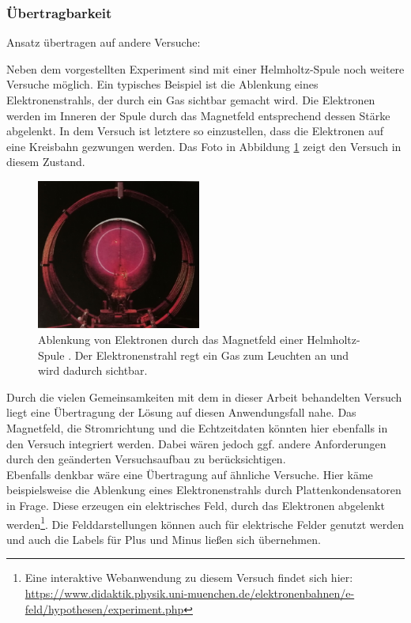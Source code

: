 \subsubsection{Übertragbarkeit}
Ansatz übertragen auf andere Versuche:

Neben dem vorgestellten Experiment sind mit einer Helmholtz-Spule noch weitere Versuche möglich. Ein typisches Beispiel ist die Ablenkung eines Elektronenstrahls, der durch ein Gas sichtbar gemacht wird. Die Elektronen werden im Inneren der Spule durch das Magnetfeld entsprechend dessen Stärke abgelenkt. In dem Versuch ist letztere so einzustellen, dass die Elektronen auf eine Kreisbahn gezwungen werden. Das Foto in Abbildung \ref{img:beam} zeigt den Versuch in diesem Zustand.\\

\begin{figure}
	\centering
	\includegraphics[width=0.48\textwidth]{images/papers/beam.jpg}
	\caption{Ablenkung von Elektronen durch das Magnetfeld einer Helmholtz-Spule \cite{Bader15}. Der Elektronenstrahl regt ein Gas zum Leuchten an und wird dadurch sichtbar.}
	\label{img:beam}
\end{figure}

Durch die vielen Gemeinsamkeiten mit dem in dieser Arbeit behandelten Versuch liegt eine Übertragung der Lösung auf diesen Anwendungsfall nahe. Das Magnetfeld, die Stromrichtung und die Echtzeitdaten könnten hier ebenfalls in den Versuch integriert werden. Dabei wären jedoch ggf. andere Anforderungen durch den geänderten Versuchsaufbau zu berücksichtigen.\\

Ebenfalls denkbar wäre eine Übertragung auf ähnliche Versuche. Hier käme beispielsweise die Ablenkung eines Elektronenstrahls durch Plattenkondensatoren in Frage. Diese erzeugen ein elektrisches Feld, durch das Elektronen abgelenkt werden\footnote{Eine interaktive Webanwendung zu diesem Versuch findet sich hier: \url{https://www.didaktik.physik.uni-muenchen.de/elektronenbahnen/e-feld/hypothesen/experiment.php}}. Die Felddarstellungen können auch für elektrische Felder genutzt werden und auch die Labels für Plus und Minus ließen sich übernehmen.\\


